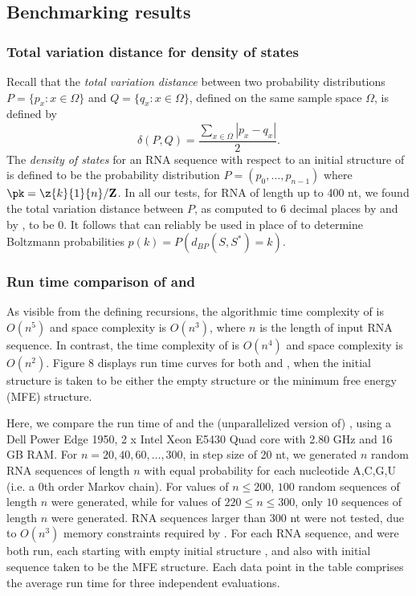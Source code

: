 \subsection*{Benchmarking results}

\subsubsection*{Total variation distance for density of states}

Recall that the {\em total variation distance}
between two probability distributions
$P = \{ p_{x} : x \in \Omega\}$ and
$Q = \{ q_{x} : x \in \Omega\}$, defined on the same sample space $\Omega$, is
defined by
\[
\delta(P,Q) = \frac{\sum_{x \in \Omega} |p_x - q_x|}{2}.
\]
The {\em density of states} for an RNA sequence \seq with respect to
an initial structure \strSt of \seq is defined to be the probability
distribution
$P = (p_0,\ldots,p_{n-1})$ where $\pk = \z{k}{1}{n}/{\bf Z}$.
In all our tests, for RNA of length up to 400 nt, we found the total
variation distance between $P$, as computed to 6 decimal places by
\rnabor and by \fftbor, to be $0$. It follows that \fftbor
can reliably be used in place of \rnabor to determine Boltzmann
probabilities $p(k) = P\left( d_{BP}(S,S^*)=k \right)$.

\subsubsection*{Run time comparison of \rnabor and \fftbor}

As visible from the defining recursions, the algorithmic time complexity of
\rnabor is $O(n^5)$ and space complexity is $O(n^3)$, where $n$ is
the length of input RNA sequence. In contrast, the time complexity of
\fftbor is $O(n^4)$ and space complexity is $O(n^2)$.
Figure 8 displays run time curves for both
\rnabor and \fftbor, when the initial structure \strSt is
taken to be either the empty structure or the minimum free energy
(MFE) structure.

Here, we compare the run time of \rnabor \citep{freyhult.b07} and
the (unparallelized version of) \fftbor, using
a Dell Power Edge 1950, 2 x Intel Xeon E5430 Quad
core with 2.80 GHz and 16 GB RAM. For $n = 20,40,60,\ldots, 300$, in step
size of 20 nt, we generated $n$ random RNA sequences of length $n$ with equal
probability for each nucleotide A,C,G,U (i.e. a $0$th order Markov chain).
For values of $n \leq 200$, $100$ random sequences of length
$n$ were generated, while for values of $220 \leq n \leq 300$, only
$10$ sequences of length $n$ were generated.
RNA sequences larger than 300 nt were not tested,
due to $O(n^3)$ memory constraints required by \rnabor.
For each RNA sequence, \rnabor and \fftbor were both run,
each starting with empty initial structure \strSt, and also
with initial sequence \strSt taken to be the MFE structure.
Each data point in the table comprises the average run time for three
independent evaluations.


